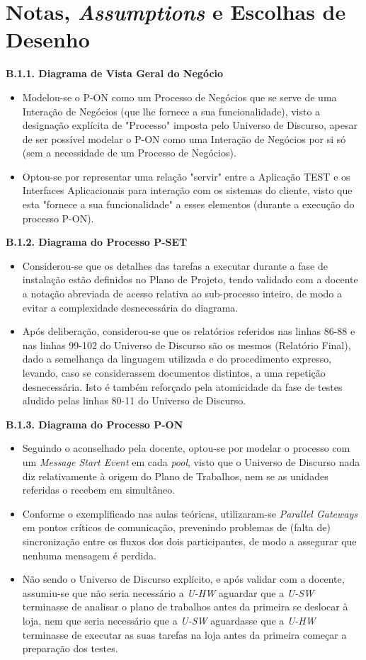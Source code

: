 \documentclass[12pt,a4paper]{article}
\begin{document}
\section*{Notas, \emph{Assumptions} e Escolhas de Desenho} \label{notes}
\normalsize
\textbf{B.1.1. Diagrama de Vista Geral do Negócio}
\begin{itemize}
	\item Modelou-se o P-ON como um Processo de Negócios que se serve de uma Interação de Negócios (que lhe fornece a sua funcionalidade), visto a designação explícita de "Processo" imposta pelo Universo de Discurso, apesar de ser possível modelar o P-ON como uma Interação de Negócios por si só (sem a necessidade de um Processo de Negócios).
	\item Optou-se por representar uma relação "servir" entre a Aplicação TEST e os Interfaces Aplicacionais para interação com os sistemas do cliente, visto que esta "fornece a sua funcionalidade" a esses elementos (durante a execução do processo P-ON).
\end{itemize}
\textbf{B.1.2. Diagrama do Processo P-SET}
\begin{itemize}
	\item Considerou-se que os detalhes das tarefas a executar durante a fase de instalação estão definidos no Plano de Projeto, tendo validado com a docente a notação abreviada de acesso relativa ao sub-processo inteiro, de modo a evitar a complexidade desnecessária do diagrama.
	\item Após deliberação, considerou-se que os relatórios referidos nas linhas 86-88 e nas linhas 99-102 do Universo de Discurso são os mesmos (Relatório Final), dado a semelhança da linguagem utilizada e do procedimento expresso, levando, caso se considerassem documentos distintos, a uma repetição desnecessária. Isto é também reforçado pela atomicidade da fase de testes aludido pelas linhas 80-11 do Universo de Discurso.
\end{itemize}
\textbf{B.1.3. Diagrama do Processo P-ON}
\begin{itemize}
	\item Seguindo o aconselhado pela docente, optou-se por modelar o processo com um \emph{Message Start Event} em cada \emph{pool}, visto que o Universo de Discurso nada diz relativamente à origem do Plano de Trabalhos, nem se as unidades referidas o recebem em simultâneo.
	\item Conforme o exemplificado nas aulas teóricas, utilizaram-se \emph{Parallel Gateways} em pontos críticos de comunicação, prevenindo problemas de (falta de) sincronização entre os fluxos dos dois participantes, de modo a assegurar que nenhuma mensagem é perdida.
	\item Não sendo o Universo de Discurso explícito, e após validar com a docente, assumiu-se que não seria necessário a \emph{U-HW} aguardar que a \emph{U-SW} terminasse de analisar o plano de trabalhos antes da primeira se deslocar à loja, nem que seria necessário que a \emph{U-SW} aguardasse que a \emph{U-HW} terminasse de executar as suas tarefas na loja antes da primeira começar a preparação dos testes.
\end{itemize}
\end{document}
